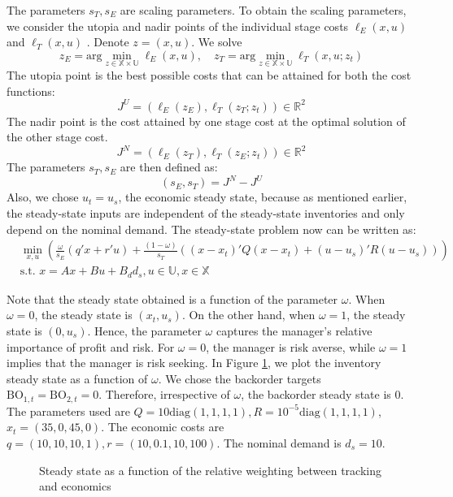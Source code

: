\documentclass{elsarticle}
\newcommand{\BO}{\textrm{BO}}
\newcommand{\diag}{\text{diag}}
\theoremstyle{definition}
\begin{document}
The parameters $s_T,s_E$ are scaling parameters. To obtain the scaling
parameters, we consider the utopia and nadir points of the individual
stage costs $\ell_E(x,u)$ and $\ell_T(x,u)$
\cite{kim:weck:2005}. Denote $z=(x,u)$. We solve
\[ z_E = \text{arg}\min_{z \in \mathbb{X} \times \mathbb{U}}{\ell_E(x,u)}, \quad z_T = \text{arg}\min_{z \in \mathbb{X} \times
  \mathbb{U}}{\ell_T(x,u;z_t)} \]
The utopia point is the best possible costs that can be attained for
both the cost functions:
\[J^U = (\ell_E(z_E),\ell_T(z_T;z_t))\in
\mathbb{R}^2\] 
The nadir point is the cost attained by one stage cost at the optimal
solution of the other stage cost.
\[J^N = (\ell_E(z_T),\ell_T(z_E;z_t))\in
\mathbb{R}^2 \] 
The parameters $s_T,s_E$ are then defined as:
\[ (s_E,s_T) = J^N-J^U \]
Also, we chose $u_t = u_s$, the economic steady state, because as
mentioned earlier, the steady-state inputs are independent of the
steady-state inventories and only depend on the nominal demand.
The steady-state problem now can be written as:
\begin{align}
\label{eq:esc:SSMulti}
&\min_{x,u}{}(\frac{\omega}{s_E} (q'x+r'u) +
\frac{(1-\omega)}{s_T}((x-x_t)'Q(x-x_{t})+(u-u_s)'R(u-u_s)))
\nonumber\\
&\text{s.t.~} x=Ax+Bu+B_dd_s, u \in \mathbb{U}, x \in \mathbb{X} 
\end{align}

Note that the steady state obtained is a function of the parameter $\omega$.
When $\omega = 0$, the steady state is $(x_t,u_s)$. On the other hand,
when $\omega = 1$, the steady state is $({0},u_s)$. Hence,
the parameter $\omega$ captures the manager's relative importance
of profit and risk. For $\omega = 0$, 
the manager is risk averse, while $\omega = 1$ implies that the
manager is risk seeking. In Figure \ref{fig:esc:SS_omega}, we plot
the inventory steady state as a function of $\omega$. We chose the
backorder targets $\BO_{1,t} = \BO_{2,t} = 0$. Therefore, irrespective
of $\omega$, the backorder steady state is $0$. The parameters used
are  $ Q =
10\diag{(1,1,1,1)}, R = 10^{-5}\diag{(1,1,1,1)}$, $x_{t}
= (35,0,45,0)$. The economic costs are $q = (10,10,10,1), r =
(10,0.1,10,100)$. The nominal demand is $d_s = 10$. 

\begin{figure}
\centering
\scriptsize
{\resizebox{\textwidth}{!}{}}
\caption{Steady state as a function of the relative weighting between
  tracking and  economics}
\label{fig:esc:SS_omega}
\end{figure}
\end{document}

